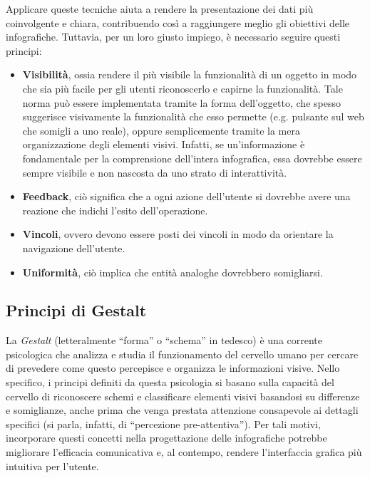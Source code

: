 \bigskip
\noindent Applicare queste tecniche aiuta a rendere la presentazione dei dati più coinvolgente e chiara, contribuendo così a raggiungere meglio gli obiettivi delle infografiche.
Tuttavia, per un loro giusto impiego, è necessario seguire questi principi:
\begin{itemize}
    \item \textbf{Visibilità}, ossia rendere il più visibile la funzionalità di un oggetto in modo che sia più facile per gli utenti riconoscerlo e capirne la funzionalità. Tale norma può
    essere implementata tramite la forma dell'oggetto, che spesso suggerisce visivamente la funzionalità che esso permette (e.g. pulsante sul web che somigli a uno reale), oppure semplicemente tramite
    la mera organizzazione degli elementi visivi. Infatti, se un'informazione è fondamentale per la comprensione dell'intera infografica, essa dovrebbe essere sempre visibile e non nascosta da uno strato di interattività.
    \item \textbf{Feedback}, ciò significa che a ogni azione dell'utente si dovrebbe avere una reazione che indichi l'esito dell'operazione.
    \item \textbf{Vincoli}, ovvero devono essere posti dei vincoli in modo da orientare la navigazione dell'utente.
    \item \textbf{Uniformità}, ciò implica che entità analoghe dovrebbero somigliarsi.
\end{itemize}


\subsection{Principi di Gestalt}\label{subsec:gestalt}
La \emph{Gestalt} (letteralmente ``forma'' o ``schema'' in tedesco) è una corrente psicologica che analizza e studia il funzionamento del cervello umano per cercare di prevedere come questo percepisce e organizza le informazioni visive. 
Nello specifico, i principi definiti da questa psicologia si basano sulla capacità del cervello di riconoscere schemi e classificare elementi visivi basandosi su differenze e somiglianze, anche prima che venga prestata attenzione consapevole ai dettagli specifici (si parla, infatti, di ``percezione pre-attentiva''). 
Per tali motivi, incorporare questi concetti nella progettazione delle infografiche potrebbe migliorare l'efficacia comunicativa e, al contempo, rendere l'interfaccia grafica più intuitiva per l'utente.

